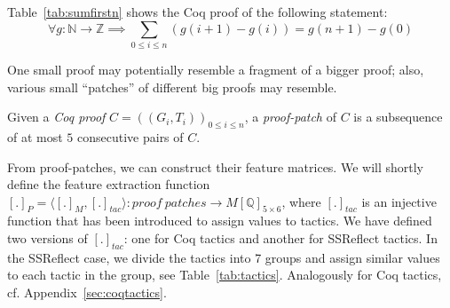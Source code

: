 \begin{example}\label{example0}
Table~\ref{tab:sumfirstn} shows the Coq proof of the following statement:
 $$\forall g:\mathbb{N} \rightarrow \mathbb{Z}\implies \sum_{0\leq i \leq n} (g(i+1) - g(i)) = g(n+1) - g(0)$$
\end{example}

One small proof may potentially
resemble a fragment of a bigger proof; also, various small ``patches'' of different big proofs may resemble.

\begin{definition}
 Given a \emph{Coq proof} $C=((G_i,T_i))_{0\leq i\leq n}$, a \emph{proof-patch} of $C$ is a subsequence of at most $5$ consecutive
 pairs of $C$.
\end{definition}

From proof-patches, we can construct their feature matrices.
We will shortly define the feature extraction function $[.]_P=\langle[.]_M,[.]_{tac}\rangle : proof~patches \rightarrow M[\mathbb{Q}]_{5\times 6}$,
where $[.]_{tac}$ is an injective function that has been introduced to assign values to tactics.
We have defined two versions of  $[.]_{tac}$: one for Coq tactics and another for SSReflect tactics.
In the SSReflect case, we divide the tactics into 7 groups and assign similar
values to each tactic in the group, see Table~\ref{tab:tactics}.
Analogously for Coq tactics, cf. Appendix~\ref{sec:coqtactics}.

